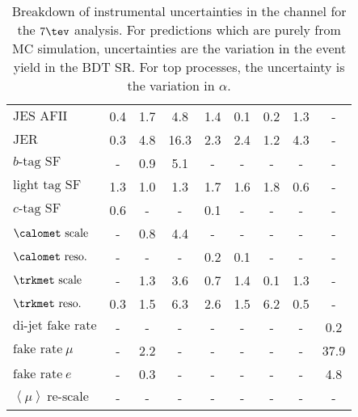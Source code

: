 \begin{table}[p!]
\begin{center}
{\begin{tabular}{l || c c | c c c c c c }
$\textrm{JES AFII}$ & 0.4 & 1.7 & 4.8 & 1.4 & 0.1 & 0.2 & 1.3 & - \\
$\textrm{JER}$ & 0.3 & 4.8 & 16.3 & 2.3 & 2.4 & 1.2 & 4.3 & - \\
$b\textrm{-tag SF}$ & - & 0.9 & 5.1 & - & - & - & - & - \\
$\textrm{light tag SF}$ & 1.3 & 1.0 & 1.3 & 1.7 & 1.6 & 1.8 & 0.6 & -
\\
$c\textrm{-tag SF}$ & 0.6 & - & - & 0.1 & - & - & - & - \\
$\calomet~\textrm{scale}$ & - & 0.8 & 4.4 & - & - & - & - & - \\
$\calomet~\textrm{reso.}$ & - & - & - & 0.2 & 0.1 & - & - & - \\
$\trkmet~\textrm{scale}$ & - & 1.3 & 3.6 & 0.7 & 1.4 & 0.1 & 1.3 & -
\\
$\trkmet~\textrm{reso.}$ & 0.3 & 1.5 & 6.3 & 2.6 & 1.5 & 6.2 & 0.5 & -
\\
$\textrm{di-jet fake rate}$ & - & - & - & - & - & - & - & 0.2 \\
$\textrm{fake rate}~\mu$ & - & 2.2 & - & - & - & - & - & 37.9 \\
$\textrm{fake rate}~e$ & - & 0.3 & - & - & - & - & - & 4.8 \\
$\left \langle \mu \right \rangle~\textrm{re-scale}$ & - & - & - & - &
- & - & - & - \\
\hline
\end{tabular}
}
\caption[Instrumental uncertainty summary in the \eemm
  channel for the $7 \tev$ analysis.]{Breakdown of instrumental
  uncertainties in the \eemm
  channel for the $7 \tev$ analysis. For predictions which are purely
  from MC simulation,
  uncertainties are
  the variation in the event yield in the BDT SR. For top processes,
  the uncertainty is the variation in $\alpha$.}
\label{chap:analysis:tab:exp_sys_sf_2011}
\end{center}
\end{table}
